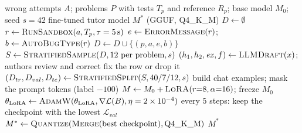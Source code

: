
\begin{algorithm}[t]
\caption{Dataset preparation and LoRA fine-tuning}
\label{alg:train}
\begin{algorithmic}[1]
\Require wrong attempts $A$; problems $P$ with tests $T_p$ and reference $R_p$; base model $M_0$; seed $s=42$
\Ensure fine-tuned tutor model $M^{*}$ (GGUF, Q4\_K\_M)
\State $D \gets \emptyset$
    \State $r \gets \textsc{RunSandbox}(a, T_p, \tau = 5\,\text{s})$
        \State $e \gets \textsc{ErrorMessage}(r)$; \ $b \gets \textsc{AutoBugType}(r)$
        \State $D \gets D \cup \{(p, a, e, b)\}$
    \EndIf
\EndFor
\State $S \gets \textsc{StratifiedSample}(D, 12 \text{ per problem}, s)$ 
    \State $(h_1, h_2, \mathit{ex}, f) \gets \textsc{LLMDraft}(x)$; authors review and correct
        \State fix the row or drop it
    \EndIf
\EndFor
\State $(D_{tr}, D_{val}, D_{te}) \gets \textsc{StratifiedSplit}(S, 40/7/12, s)$
\State build chat examples; mask the prompt tokens (label $-100$)
\State $M \gets M_0 + \textsc{LoRA}(r{=}8, \alpha{=}16)$; freeze $M_0$
        \State $\theta_{\mathrm{LoRA}} \gets \textsc{AdamW}(\theta_{\mathrm{LoRA}}, \nabla \mathcal{L}(B), \eta = 2\times10^{-4})$
        \State every 5 steps: keep the checkpoint with the lowest $\mathcal{L}_{val}$
    \EndFor
\EndFor
\State $M^{*} \gets \textsc{Quantize}(\textsc{Merge}(\text{best checkpoint}), \text{Q4\_K\_M})$
\State \Return $M^{*}$
\end{algorithmic}
\end{algorithm}

